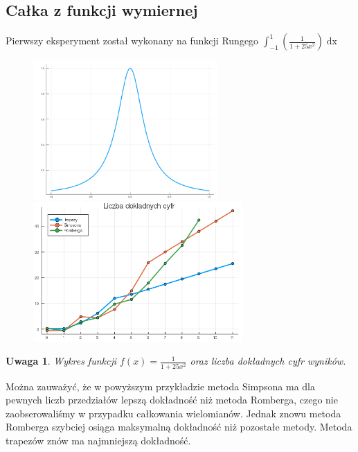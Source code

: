 \documentclass[11pt,wide]{article}
\newtheorem{remark}{Uwaga}
\begin{document}
\subsection{Całka z funkcji wymiernej}
Pierwszy eksperyment został wykonany na funkcji Rungego \(\displaystyle \int_{-1}^{1} \left(\frac{1}{1+25x^2}\right)\mathop{dx} \)
\begin{figure}[h!]
	\includegraphics[width=70mm,scale=0.5]{wym1}
	\includegraphics[width=80mm,scale=0.5]{wym_blad1}
\end{figure}
\begin{remark}
\centering
Wykres funkcji \(\displaystyle f(x) = \frac{1}{1+25x^2} \) oraz liczba dokładnych cyfr wyników.
\end{remark}
Można zauważyć, że w powyższym przykładzie metoda Simpsona ma dla pewnych liczb przedziałów lepszą dokładność niż metoda Romberga, czego nie zaobserowaliśmy w przypadku całkowania wielomianów. Jednak znowu metoda Romberga szybciej osiąga maksymalną dokładność niż pozostałe metody. Metoda trapezów znów ma najmniejszą dokładność. \\ \\
\end{document}
